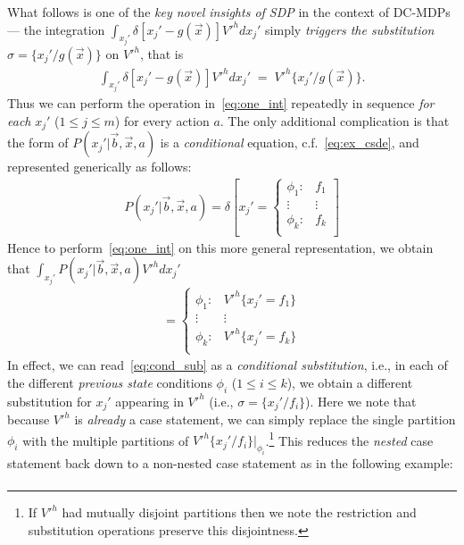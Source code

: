 \documentclass[letterpaper]{article}
\begin{document}
\begin{enumerate}
What follows is one of the \emph{key novel insights of SDP} in the context of
DC-MDPs --- the integration 
$\int_{x_j'} \delta[x_j' - g(\vec{x})] V'^{h} dx_j'$ 
simply \emph{triggers the substitution} $\sigma = \{ x_j' / g(\vec{x}) \}$
on $V'^{h}$, that is
\begin{align}
\int_{x_j'} \delta[x_j' - g(\vec{x})] V'^{h} dx_j' \; = \; V'^{h} \{x_j' / g(\vec{x}) \} . \label{eq:one_int}
\end{align}
Thus we can perform the
operation in~\eqref{eq:one_int} repeatedly in sequence \emph{for each}
$x_j'$ ($1 \leq j \leq m$) for every action $a$.  The only
additional complication is that the form of 
$P(x_j'|\vec{b},\vec{x},a)$ is a \emph{conditional} 
equation, c.f.~\eqref{eq:ex_csde}, and represented generically
as follows:
\begin{align}
   P(x_j'|\vec{b},\vec{x},a) = \delta\left[ x_j' = \begin{cases}
    \phi_1: & f_1 \\ 
   \vdots&\vdots\\ 
    \phi_k: & f_k \\ 
  \end{cases} \right] \label{eq:cond_sub}
\end{align}
Hence to perform~\eqref{eq:one_int} on this more general
representation, we obtain that $\int_{x_j'} P(x_j'|\vec{b},\vec{x},a) V'^{h} dx_j'$
\begin{align*}
    = \begin{cases}
    \phi_1: & V'^{h} \{ x_j' = f_1 \} \\ 
   \vdots&\vdots\\ 
    \phi_k: & V'^{h} \{ x_j' = f_k \}  \\ 
  \end{cases}
\end{align*}
In effect, we can read~\eqref{eq:cond_sub} as a \emph{conditional
substitution}, i.e., in each of the different \emph{previous state}
conditions $\phi_i$ ($1 \leq i \leq k$), we obtain a different
substitution for $x_j'$ appearing in $V'^{h}$ (i.e., $\sigma = \{ x_j' / f_i
\}$).  Here we note that because $V'^{h}$ is \emph{already} a case
statement, we can simply replace the single partition $\phi_i$ with the
multiple partitions of $V'^h \{ x_j' / f_i \}|_{\phi_i}$.\footnote{If $V'^h$
had mutually disjoint partitions then we note the restriction and
substitution operations preserve this disjointness.}  This reduces
the \emph{nested} case statement back down to a non-nested case
statement as in the following example:
\begin{align*}

\end{align*}
\end{enumerate}
\end{document}
